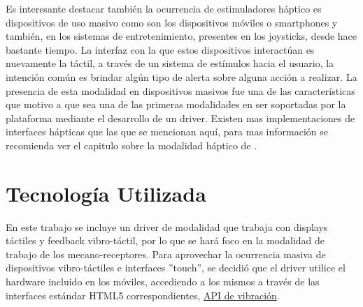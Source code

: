 Es interesante destacar también la ocurrencia de estimuladores háptico es dispositivos de uso masivo como son los dispositivos móviles o smartphones y también, en los sistemas de entretenimiento, presentes en los joysticks, desde hace bastante tiempo. La interfaz con la que estos dispositivos interactúan es nuevamente la táctil, a través de un sistema de estímulos hacia el usuario, la intención común es brindar algún tipo de alerta sobre alguna acción a realizar.
La presencia de esta modalidad en dispositivos masivos fue una de las características que motivo a que sea una de las primeras modalidades en ser soportadas por la plataforma mediante el desarrollo de un driver.
Existen mas implementaciones de interfaces hápticas que las que se mencionan aquí, para mas información se recomienda ver el capitulo sobre la modalidad háptico de \citet{kortum2008hci}.

\section{Tecnología Utilizada}
En este trabajo se incluye un driver de modalidad que trabaja con displays táctiles y feedback vibro-táctil, por lo que se hará foco en la modalidad de trabajo de los mecano-receptores.
Para aprovechar la ocurrencia masiva de dispositivos vibro-táctiles e interfaces ''touch'', se decidió que el driver utilice el hardware incluido en los móviles, accediendo a los mismos a través de las interfaces estándar HTML5 correspondientes, \eg  \href{http://www.w3.org/TR/vibration/}{API de vibración}.
